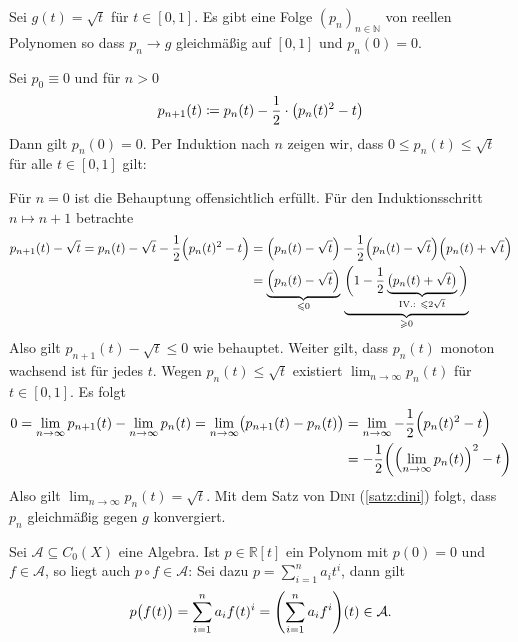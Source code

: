 \begin{lemma}[{name=[Approximation der Wurzelfunktion]},label=lem:wurzel-approx]
	Sei $g(t) = \sqrt{t}$ für $t \in [0,1]$. 
	Es gibt eine Folge $(p_n)_{n \in \mathbb{N}}$ von reellen Polynomen so dass $p_n \to g$ gleichmäßig auf $[0,1]$ und $p_n(0)=0$.
\end{lemma}
\begin{beweis}
	Sei $p_0 \equiv 0$ und für $n > 0$
	\[
		p_{n+1} (t) \coloneqq p_n(t) - \frac{1}{2} \cdot \enbrace[\big]{p_n(t)^2 - t} 
	\]
	Dann gilt $p_n(0)=0$. Per Induktion nach $n$ zeigen wir, dass $0 \le p_n(t) \le \sqrt{t}$ für alle $t \in [0,1]$ gilt:
	
	Für $n=0$ ist die Behauptung offensichtlich erfüllt.
	Für den Induktionsschritt $n \mapsto n+1$ betrachte
	\begin{align*}
		p_{n+1}(t) - \sqrt{t} = p_n(t) - \sqrt{t} - \frac{1}{2} \enbrace[\Big]{p_n(t)^2 -t} &= \enbrace*{p_n(t) - \sqrt{t} }- \frac{1}{2} \enbrace*{p_n(t)- \sqrt{t}} \enbrace*{p_n(t) + \sqrt{t}} \\
		&=\underbrace{\enbrace*{p_n(t) - \sqrt{t}  } }_{\le 0} \, \underbrace{\bigg( 1- \frac{1}{2}\underbrace{\enbrace[\big]{p_n(t) + \sqrt{t}  }}_{\text{IV.: }\le 2 \sqrt{t}} \bigg)
		}_{\ge 0} 
	\end{align*}
	Also gilt $p_{n+1}(t)- \sqrt{t} \le 0$ wie behauptet. 
	Weiter gilt, dass $p_n(t)$ monoton wachsend ist für jedes $t$. 
	Wegen $p_n(t) \le \sqrt{t}$ existiert $\lim_{ n \to \infty} p_n(t)$
	für $t \in [0,1]$. Es folgt 
	\begin{align*}
		0 = \lim_{ n \to \infty} p_{n+1}(t) - \lim_{ n \to \infty} p_n(t) = \lim_{ n \to \infty} \enbrace[\big]{p_{n+1}(t) - p_n(t)} &= \lim_{ n \to \infty} 
		-\frac{1}{2} \enbrace[\Big]{p_n(t)^2 -t  } \\
		&= - \frac{1}{2} \enbrace*{ \enbrace*{\lim_{ n \to \infty} p_n(t)}^2 -t }  
	\end{align*}
	Also gilt $\lim_{ n \to \infty} p_n(t) = \sqrt{t}$. 
	Mit dem Satz von \textsc{Dini} (\ref{satz:dini}) folgt, dass $p_n$ gleichmäßig gegen $g$ konvergiert.
\end{beweis}

\begin{bemerkung}[{name=[Komposition von Elementen einer Unteralgebra mit Polynomen]},label=bem:komp-polynome]
	Sei $\mathcal{A} \subseteq C_0(X)$ eine Algebra. 
	Ist $p \in \mathbb{R}[t]$ ein Polynom mit $p(0)=0$ und $f \in \mathcal{A}$, so liegt auch $p \circ f \in \mathcal{A}$:
	Sei dazu $p= \sum_{i=1}^{n} a_i t^i$, dann gilt 
	\[
		p\enbrace[\big]{f(t)} = \sum_{i=1}^{n} a_i f(t)^i = \enbrace*{\sum_{i=1}^{n} a_i f^i} (t) \in \mathcal{A}. 
	\]
\end{bemerkung}

